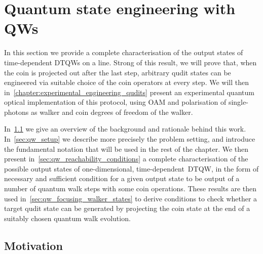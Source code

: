 
\chapter{Quantum state engineering with QWs}
\label{chapter:quantum_walks}

In this section we provide a complete characterisation of the output states of time-dependent \acp{DTQW} on a line. Strong of this result, we will prove that, when the coin is projected out after the last step, arbitrary qudit states can be engineered via suitable choice of the coin operators at every step.
We will then in~\cref{chapter:experimental_engineering_qudits} present an experimental quantum optical implementation of this protocol, using \ac{OAM} and polarisation of single-photons as walker and coin degrees of freedom of the walker.

In~\cref{sec:qw_motivation} we give an overview of the background and rationale behind this work.
In~\cref{sec:qw_setup} we describe more precisely the problem setting, and introduce the fundamental notation that will be used in the rest of the chapter.
We then present in~\cref{sec:qw_reachability_conditions} a complete characterisation of the possible output states of one-dimensional, time-dependent~\ac{DTQW}, in the form of necessary and sufficient condition for a given output state to be output of a number of quantum walk steps with some coin operations.
These results are then used in~\cref{sec:qw_focusing_walker_states} to derive conditions to check whether a target qudit state can be generated by projecting the coin state at the end of a suitably chosen quantum walk evolution.


\section{Motivation}
\label{sec:qw_motivation}

